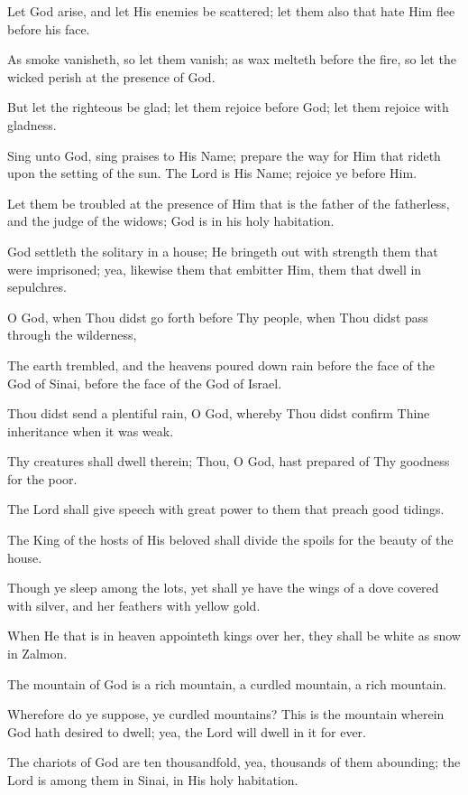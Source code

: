 Let God arise, and let His enemies be scattered; let them also that hate Him flee before his face.

As smoke vanisheth, so let them vanish; as wax melteth before the fire, so let the wicked perish at the presence of God.

But let the righteous be glad; let them rejoice before God; let them rejoice with gladness.

Sing unto God, sing praises to His Name; prepare the way for Him that rideth upon the setting of the sun. The Lord is His Name; rejoice ye before Him.

Let them be troubled at the presence of Him that is the father of the fatherless, and the judge of the widows; God is in his holy habitation.

God settleth the solitary in a house; He bringeth out with strength them that were imprisoned; yea, likewise them that embitter Him, them that dwell in sepulchres.

O God, when Thou didst go forth before Thy people, when Thou didst pass through the wilderness,

The earth trembled, and the heavens poured down rain before the face of the God of Sinai, before the face of the God of Israel.

Thou didst send a plentiful rain, O God, whereby Thou didst confirm Thine inheritance when it was weak.

Thy creatures shall dwell therein; Thou, O God, hast prepared of Thy goodness for the poor.

The Lord shall give speech with great power to them that preach good tidings.

The King of the hosts of His beloved shall divide the spoils for the beauty of the house.

Though ye sleep among the lots, yet shall ye have the wings of a dove covered with silver, and her feathers with yellow gold.

When He that is in heaven appointeth kings over her, they shall be white as snow in Zalmon.

The mountain of God is a rich mountain, a curdled mountain, a rich mountain.

Wherefore do ye suppose, ye curdled mountains? This is the mountain wherein God hath desired to dwell; yea, the Lord will dwell in it for ever.

The chariots of God are ten thousandfold, yea, thousands of them abounding; the Lord is among them in Sinai, in His holy habitation.

